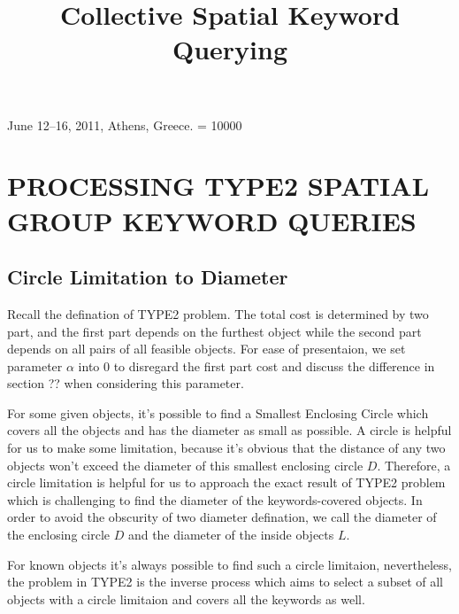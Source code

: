 \documentclass{sig-alternate}
\begin{document}
 {June 12--16, 2011, Athens, Greece.}
\widowpenalty = 10000
%

\title{Collective Spatial Keyword Querying}
%
%



\maketitle


\section{PROCESSING TYPE2 SPATIAL GROUP KEYWORD QUERIES} \label{sec:type2}
\subsection{Circle Limitation to Diameter} \label{secsub:type2:limitation}
Recall the defination of \textsf{TYPE2} problem. The total cost is determined
by two part, and the first part depends on the furthest object while
the second part depends on all pairs of all feasible objects.
For ease of presentaion, we set parameter $\alpha$ into 0
to disregard the first part cost and discuss the difference
in section ?? when considering this parameter.\par
%
For some given objects, it's possible to find a \textsf{Smallest Enclosing Circle}
which covers all the objects and has the diameter as small as possible. A circle is
helpful for us to make some limitation, because it's obvious that the distance of
any two objects won't exceed the diameter of this smallest enclosing circle $D$.
Therefore, a circle limitation is helpful for us to approach the exact result
of \textsf{TYPE2} problem which is challenging to find the diameter of the keywords-covered
objects. In order to avoid the obscurity of two diameter defination, we call the
diameter of the enclosing circle $D$ and the diameter of the inside objects $L$.\par
%
For known objects it's always possible to find such a circle limitaion,
nevertheless, the problem in \textsf{TYPE2} is the inverse process which aims to
select a subset of all objects with a circle limitaion and covers all the
keywords as well.
\end{document}
